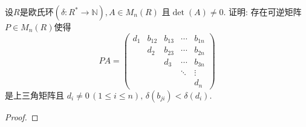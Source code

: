 \begin{problem}
    设$R$是欧氏环$(\delta: R^* \to \mathbb{N}), A \in M_n(R)$
且$\det(A) \neq 0$. 证明: 存在可逆矩阵$P \in M_n(R)$使得
\[
    PA = 
    \begin{pmatrix}
        d_1 & b_{12} & b_{13} & \cdots & b_{1n}\\
        & d_2 & b_{23} & \cdots & b_{2n}\\
        & & d_3 & \cdots & b_{3n}\\
        & & & \ddots & \vdots\\
        & & & & d_n
    \end{pmatrix}
\]
是上三角矩阵且
$d_i \neq 0 \, (1 \leqslant i \leqslant n),\, \delta(b_{ji}) < \delta(d_i)$.
\end{problem}

\begin{proof}
    
\end{proof}